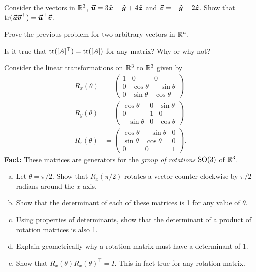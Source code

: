 \documentclass[12pt]{article} %
\begin{document}
\begin{problem}
Consider the vectors in $\mathbb{R}^3$, $\boldsymbol{\boldsymbol{\vec{u}}}=3\boldsymbol{\hat{x}} - \boldsymbol{\hat{y}} + 4\boldsymbol{\hat{z}}$ and $\boldsymbol{\boldsymbol{\vec{v}}}=-\boldsymbol{\hat{y}} - 2\boldsymbol{\hat{z}}$.  Show that $\mathrm{tr}(\boldsymbol{\boldsymbol{\vec{u}}} \boldsymbol{\boldsymbol{\vec{v}}}^\top) = \boldsymbol{\boldsymbol{\vec{u}}}^\top \boldsymbol{\boldsymbol{\vec{v}}}$.
\end{problem}

\begin{problem}
Prove the previous problem for two arbitrary vectors in $\mathbb{R}^n$.
\end{problem}

\begin{problem}
Is it true that $\mathrm{tr}([A]^\top)=\mathrm{tr}([A])$ for any matrix? Why or why not?
\end{problem}

\begin{problem}
Consider the linear transformations on $\mathbb{R}^3$ to $\mathbb{R}^3$ given by
\begin{align*}
    R_x(\theta) &= \begin{pmatrix} 1 & 0 & 0 \\ 0 & \cos\theta & -\sin \theta \\ 0 & \sin\theta & \cos \theta \end{pmatrix}\\
    R_y(\theta) &= \begin{pmatrix} \cos \theta & 0 & \sin \theta \\ 0 & 1 & 0 \\ -\sin \theta & 0 & \cos \theta \end{pmatrix}\\
    R_z(\theta) &= \begin{pmatrix} \cos \theta & -\sin \theta & 0 \\ \sin \theta & \cos \theta  & 0 \\ 0 & 0 & 1 \end{pmatrix}.
\end{align*}
\textbf{Fact:} These matrices are generators for the \emph{group of rotations} $\mathrm{SO}(3)$ of $\mathbb{R}^3$.
\begin{enumerate}[(a)]
    \item Let $\theta = \pi/2$. Show that $R_x(\pi/2)$ rotates a vector counter clockwise by $\pi/2$ radians around the $x$-axis.
    \item Show that the determinant of each of these matrices is 1 for any value of $\theta$.
    \item Using properties of determinants, show that the determinant of a product of rotation matrices is also 1.
    \item Explain geometrically why a rotation matrix must have a determinant of 1.
    \item Show that $R_x(\theta)R_x(\theta)^\top = I$. This in fact true for any rotation matrix.
\end{enumerate}
\end{problem}
\end{document}
